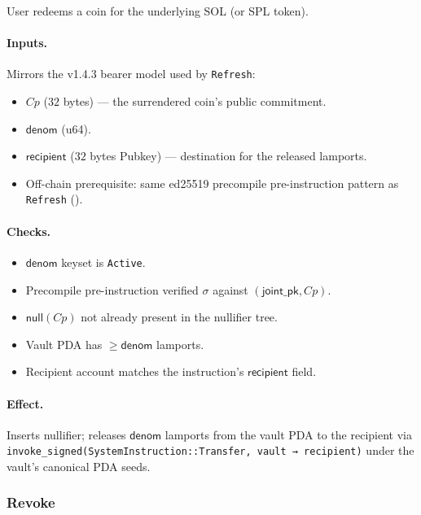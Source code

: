 User redeems a coin for the underlying SOL (or SPL token).

\paragraph{Inputs.} Mirrors the v1.4.3 bearer model used by
\texttt{Refresh}:
\begin{itemize}[leftmargin=2em,itemsep=0pt]
  \item $Cp$ ($32$ bytes) --- the surrendered coin's public commitment.
  \item $\mathsf{denom}$ (u64).
  \item $\mathsf{recipient}$ ($32$ bytes Pubkey) --- destination for
        the released lamports.
  \item Off-chain prerequisite: same ed25519 precompile pre-instruction
        pattern as \texttt{Refresh} ().
\end{itemize}

\paragraph{Checks.}
\begin{itemize}[leftmargin=2em,itemsep=0pt]
  \item $\mathsf{denom}$ keyset is \texttt{Active}.
  \item Precompile pre-instruction verified $\sigma$ against $(\mathsf{joint\_pk}, Cp)$.
  \item $\mathsf{null}(Cp)$ not already present in the nullifier tree.
  \item Vault PDA has $\geq \mathsf{denom}$ lamports.
  \item Recipient account matches the instruction's $\mathsf{recipient}$ field.
\end{itemize}

\paragraph{Effect.} Inserts nullifier; releases $\mathsf{denom}$
lamports from the vault PDA to the recipient via
\verb|invoke_signed(SystemInstruction::Transfer, vault → recipient)|
under the vault's canonical PDA seeds.

\subsubsection{Revoke}
\label{sec:onchain-instr-revoke}

